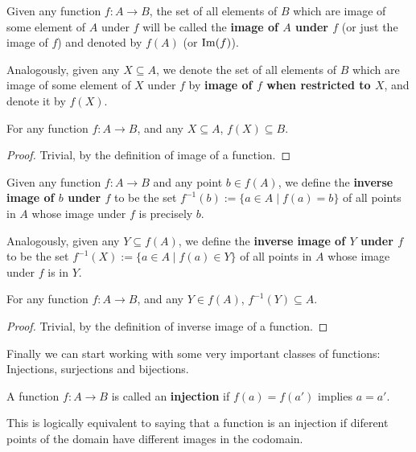 \begin{df}
	Given any function $f:A\to B$, the set of all elements of $B$ which are image of some element of $A$ under $f$ will be called the \textbf{image of $A$ under $f$} (or just the image of $f$) and denoted by $f(A)$ (or $\operatorname{Im}(f)$).
	
	Analogously, given any $X\subseteq A$, we denote the set of all elements of $B$ which are image of some element of $X$ under $f$ by \textbf{image of $f$ when restricted to $X$}, and denote it by $f(X)$.
\end{df}
\begin{prop}
	For any function $f:A\to B$, and any $X\subseteq A$, $f(X)\subseteq B$.
\end{prop}
\begin{proof}
	Trivial, by the definition of image of a function.
\end{proof}

\begin{df}
	Given any function $f:A\to B$ and any point $b\in f(A)$, we define the \textbf{inverse image of $b$ under $f$} to be the set $f^{-1}(b):=\{a\in A\mid f(a)=b\}$ of all points in $A$ whose image under $f$ is precisely $b$.
	
	Analogously, given any $Y\subseteq f(A)$, we define the \textbf{inverse image of $Y$ under $f$} to be the set $f^{-1}(X):=\{a\in A\mid f(a)\in Y\}$ of all points in $A$ whose image under $f$ is in $Y$.
\end{df}
\begin{prop}
	For any function $f:A\to B$, and any $Y\in f(A)$, $f^{-1}(Y)\subseteq A$.
\end{prop}
\begin{proof}
	Trivial, by the definition of inverse image of a function.
\end{proof}

Finally we can start working with some very important classes of functions: Injections, surjections and bijections.

\begin{df}
	A function $f:A\to B$ is called an \textbf{injection} if $f(a)=f(a')$ implies $a=a'$.
\end{df}

\begin{rmk}
	This is logically equivalent to saying that a function is an injection if diferent points of the domain have different images in the codomain.
\end{rmk}

